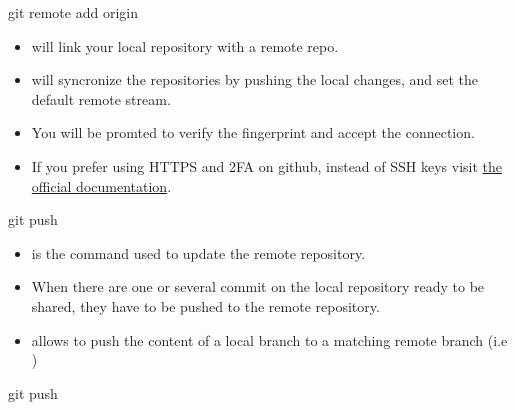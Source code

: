 \begin{frame}[fragile]{git remote add origin}
    \begin{itemize}[<+->] 
        \item {} will link your local repository with a remote repo.
        \item {} will syncronize the repositories by \alert{pushing} the local changes, and set the default remote stream.
        \item You will be promted to verify the fingerprint and accept the connection.
        \item If you prefer using HTTPS and 2FA on github, instead of SSH keys visit \href{https://docs.github.com/en/github/getting-started-with-github/about-remote-repositories#cloning-with-https-urls}{the official documentation}.
    \end{itemize}
\end{frame}

\begin{frame}[fragile]{git push}
    \begin{itemize}[<+->] 
        \item {} is the command used to update the remote repository.
        \item When there are one or several commit on the local repository ready to be shared, they have to be pushed to the remote repository.
        \item {} allows to push the content of a local branch to a matching remote branch (i.e )
    \end{itemize}
\end{frame}

\begin{frame}[fragile]{git push \insertcontinuationtext}
\end{frame}

